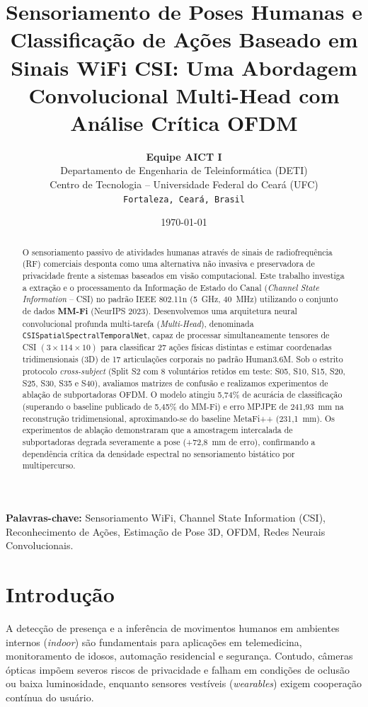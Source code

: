\documentclass[10pt,a4paper,twocolumn]{article}
\title{\textbf{Sensoriamento de Poses Humanas e Classificação de Ações Baseado em Sinais WiFi CSI: Uma Abordagem Convolucional Multi-Head com Análise Crítica OFDM}}
\author{
  \textbf{Equipe AICT I} \\
  Departamento de Engenharia de Teleinformática (DETI) \\
  Centro de Tecnologia -- Universidade Federal do Ceará (UFC) \\
  \texttt{Fortaleza, Ceará, Brasil}
}
\date{\today}
\begin{document}
\maketitle

\begin{abstract}
O sensoriamento passivo de atividades humanas através de sinais de radiofrequência (RF) comerciais desponta como uma alternativa não invasiva e preservadora de privacidade frente a sistemas baseados em visão computacional. Este trabalho investiga a extração e o processamento da Informação de Estado do Canal (\textit{Channel State Information} -- CSI) no padrão IEEE 802.11n (5~GHz, 40~MHz) utilizando o conjunto de dados \textbf{MM-Fi} (NeurIPS 2023). Desenvolvemos uma arquitetura neural convolucional profunda multi-tarefa (\textit{Multi-Head}), denominada \texttt{CSISpatialSpectralTemporalNet}, capaz de processar simultaneamente tensores de CSI $(3 \times 114 \times 10)$ para classificar 27 ações físicas distintas e estimar coordenadas tridimensionais (3D) de 17 articulações corporais no padrão Human3.6M. Sob o estrito protocolo \textit{cross-subject} (Split S2 com 8 voluntários retidos em teste: S05, S10, S15, S20, S25, S30, S35 e S40), avaliamos matrizes de confusão e realizamos experimentos de ablação de subportadoras OFDM. O modelo atingiu 5{,}74\% de acurácia de classificação (superando o baseline publicado de 5{,}45\% do MM-Fi) e erro MPJPE de 241{,}93~mm na reconstrução tridimensional, aproximando-se do baseline MetaFi++ (231{,}1~mm). Os experimentos de ablação demonstraram que a amostragem intercalada de subportadoras degrada severamente a pose (+72{,}8~mm de erro), confirmando a dependência crítica da densidade espectral no sensoriamento bistático por multipercurso.
\end{abstract}

\noindent\textbf{Palavras-chave:} Sensoriamento WiFi, Channel State Information (CSI), Reconhecimento de Ações, Estimação de Pose 3D, OFDM, Redes Neurais Convolucionais.

\section{Introdução}

A detecção de presença e a inferência de movimentos humanos em ambientes internos (\textit{indoor}) são fundamentais para aplicações em telemedicina, monitoramento de idosos, automação residencial e segurança. Contudo, câmeras ópticas impõem severos riscos de privacidade e falham em condições de oclusão ou baixa luminosidade, enquanto sensores vestíveis (\textit{wearables}) exigem cooperação contínua do usuário.
\end{document}
